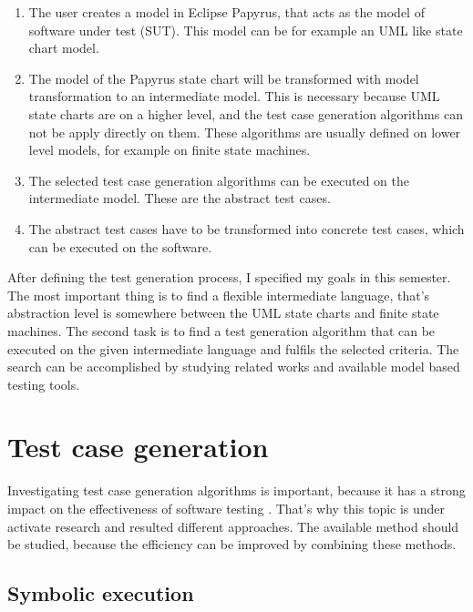 \documentclass{article}
\begin{document}
\begin{enumerate}
	\item The user creates a model in Eclipse Papyrus, that acts as the model of software under test (SUT). This model can be for example an UML like state chart model.
	\item The model of the Papyrus state chart will be transformed with model transformation to an intermediate model. This is necessary because UML state charts are on a higher level, and the test case generation algorithms can not be apply directly on them. These algorithms are usually defined on lower level models, for example on finite state machines.
	\item The selected test case generation algorithms can be executed on the intermediate model. These are the abstract test cases.
	\item The abstract test cases have to be transformed into concrete test cases, which can be executed on the software.
\end{enumerate}

After defining the test generation process, I specified my goals in this semester. The most important thing is to find a flexible intermediate language, that's abstraction level is somewhere between the UML state charts and finite state machines. The second task is to find a test generation algorithm that can be executed on the given intermediate language and fulfils the selected criteria. The search can be accomplished by studying related works and available model based testing tools.


\section{Test case generation}
\label{sec:testcasegen}

Investigating test case generation algorithms is important, because it has a strong impact on the effectiveness of software testing \cite{testcasegen} \cite{mbttestcasegeneration}. That's why this topic is under activate research and resulted different approaches. The available method should be studied, because the efficiency can be improved by combining these methods.

\subsection{Symbolic execution}
\label{sub:symbolicexecution}
\end{document}
